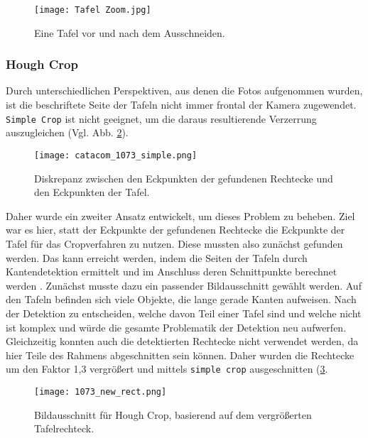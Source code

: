 \begin{figure}[h!]
\centering
\texttt{[image: Tafel Zoom.jpg]}
\caption{Eine Tafel vor und nach dem Ausschneiden.}
\label{fig:tafelcrop}
\end{figure}

\subsubsection{Hough Crop}

Durch unterschiedlichen Perspektiven, aus denen die Fotos aufgenommen wurden, ist die beschriftete Seite der Tafeln nicht immer frontal der Kamera zugewendet. \verb|Simple Crop| ist nicht geeignet, um die daraus resultierende Verzerrung auszugleichen (Vgl. Abb. \ref{fig:parallelogramm}). 

\begin{figure}[h!]
\centering
\texttt{[image: catacom\_1073\_simple.png]}
\caption{Diskrepanz zwischen den Eckpunkten der gefundenen Rechtecke und den Eckpunkten der Tafel.}
\label{fig:parallelogramm}
\end{figure}

Daher wurde ein zweiter Ansatz entwickelt, um dieses Problem zu beheben. Ziel war es hier, statt der Eckpunkte der gefundenen Rechtecke die Eckpunkte der Tafel für das Cropverfahren zu nutzen. Diese mussten also zunächst gefunden werden. Das kann erreicht werden, indem die Seiten der Tafeln durch Kantendetektion ermittelt und im Anschluss deren Schnittpunkte berechnet werden \cite{qixiangye} \cite{shaw}.
Zunächst musste dazu ein passender Bildausschnitt gewählt werden. Auf den Tafeln befinden sich viele Objekte, die lange gerade Kanten aufweisen. Nach der Detektion zu entscheiden, welche davon Teil einer Tafel sind und welche nicht ist komplex und würde die gesamte Problematik der Detektion neu aufwerfen. Gleichzeitig konnten auch die detektierten Rechtecke nicht verwendet werden, da hier Teile des Rahmens abgeschnitten sein können. Daher wurden die Rechtecke um den Faktor 1,3 vergrößert und mittels \verb|simple crop| ausgeschnitten (\ref{fig:tafelrechteck}.

\begin{figure}[h!]
\centering
\texttt{[image: 1073\_new\_rect.png]}
\caption{Bildausschnitt für Hough Crop, basierend auf dem vergrößerten Tafelrechteck.}
\label{fig:tafelrechteck}
\end{figure}

